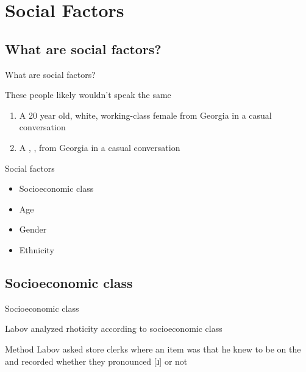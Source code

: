 \documentclass{beamer}
\subtitle[Social Factors]{Social Factors in Language Variation}
\newcommand{\suboneone}{What are social factors?}
\newcommand{\subonetwo}{Socioeconomic class}
\begin{document}
  

  \section{Social Factors}
    \subsection{\suboneone}
      \begin{frame}{\suboneone}
        \begin{block}{These people likely wouldn't speak the same}
          \begin{enumerate}
            \item A \alert<2>{20 year old}, \alert<4>{white}, \alert<1>{working-class} \alert<3>{female} from Georgia in a casual conversation
            \item A , ,   from Georgia in a casual conversation
          \end{enumerate}
        \end{block}
        \begin{block}{Social factors}
          \parbox{0.48\linewidth}{
            \begin{itemize}
              \item Socioeconomic class
              \item<2-> Age
              \item<3-> Gender
              \item<4-> Ethnicity
            \end{itemize}
          }
          \parbox{0.48\linewidth}{
          }
        \end{block}
      \end{frame}

    \subsection{\subonetwo}
      \begin{frame}{\subonetwo}
        \begin{definition}
          
        \end{definition}
        \begin{block}{Labov analyzed \alert{rhoticity} according to socioeconomic class} %
          
        \end{block}
        \begin{block}{Method}
          Labov asked store clerks where an item was that he knew to be on the  and recorded whether they pronounced [ɹ] or not
        \end{block}
      \end{frame}
\end{document}
